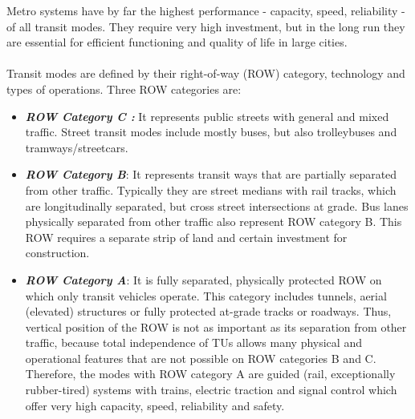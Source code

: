 Metro systems have by far the highest performance - capacity, speed, reliability - of all transit modes. They require very high investment, but in the long run they are essential for efficient functioning and quality of life in large cities.\\\\  
Transit modes are defined by their right-of-way (ROW) category, technology and types of operations. Three ROW categories are:
\begin{itemize}
	\item \textbf{\textit{ROW Category C :}} It represents public streets with general and mixed traffic. Street transit modes include mostly buses, but also trolleybuses and tramways/streetcars. 
	\item \textbf{\textit{ROW Category B}}: It represents transit ways that are partially separated from other traffic. Typically they are street medians with rail tracks, which are longitudinally separated, but
	cross street intersections at grade. Bus lanes physically separated from other traffic also represent ROW category B. This ROW requires a separate strip of land and certain investment for construction.
	\item \textbf{\textit{ROW Category A}}: It is fully separated, physically protected ROW on which only transit vehicles operate. This category includes tunnels, aerial (elevated) structures or fully protected at-grade tracks or roadways. Thus, vertical position of the ROW is not as important as its separation from other traffic, because total independence of TUs allows many physical and operational features that are not possible on ROW categories B and C. Therefore, the modes with ROW category A are guided (rail, exceptionally rubber-tired) systems with trains, electric traction and signal control which offer very high capacity, speed, reliability and safety.
\end{itemize}
%
